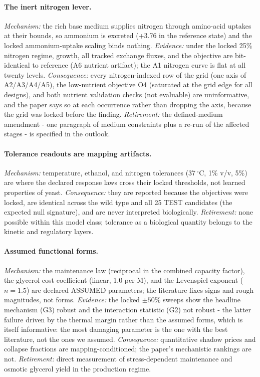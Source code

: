\documentclass[12pt]{article}
\begin{document}
\paragraph{The inert nitrogen lever.} \emph{Mechanism:} the rich base
medium supplies nitrogen through amino-acid uptakes at their bounds,
so ammonium is excreted (+3.76 in the reference state) and the locked
ammonium-uptake scaling binds nothing. \emph{Evidence:} under the
locked 25\% nitrogen regime, growth, all tracked exchange fluxes, and
the objective are bit-identical to reference (A6 nutrient artifact);
the A1 nitrogen curve is flat at all twenty levels. \emph{Consequence:}
every nitrogen-indexed row of the grid (one axis of A2/A3/A4/A5), the
low-nutrient objective O4 (saturated at the grid edge for all
designs), and both nutrient validation checks (not evaluable) are
uninformative, and the paper says so at each occurrence rather than
dropping the axis, because the grid was locked before the finding.
\emph{Retirement:} the defined-medium amendment - one paragraph of
medium constraints plus a re-run of the affected stages - is
specified in the outlook.

\paragraph{Tolerance readouts are mapping artifacts.}
\emph{Mechanism:} temperature, ethanol, and nitrogen tolerances
(37\,$^{\circ}$C, 1\% v/v, 5\%) are where the declared response laws
cross their locked thresholds, not learned properties of yeast.
\emph{Consequence:} they are reported because the objectives were
locked, are identical across the wild type and all 25 TEST candidates
(the expected null signature), and are never interpreted
biologically. \emph{Retirement:} none possible within this model
class; tolerance as a biological quantity belongs to the kinetic and
regulatory layers.

\paragraph{Assumed functional forms.} \emph{Mechanism:} the
maintenance law (reciprocal in the combined capacity factor), the
glycerol-cost coefficient (linear, 1.0 per M), and the Levenspiel
exponent ($n=1.5$) are declared ASSUMED parameters; the literature
fixes signs and rough magnitudes, not forms. \emph{Evidence:} the
locked $\pm 50\%$ sweeps show the headline mechanism (G3) robust and
the interaction statistic (G2) not robust - the latter failure driven
by the thermal margin rather than the assumed forms, which is itself
informative: the most damaging parameter is the one with the best
literature, not the ones we assumed. \emph{Consequence:} quantitative
shadow prices and collapse fractions are mapping-conditioned; the
paper's mechanistic rankings are not. \emph{Retirement:} direct
measurement of stress-dependent maintenance and osmotic glycerol
yield in the production regime.
\end{document}

